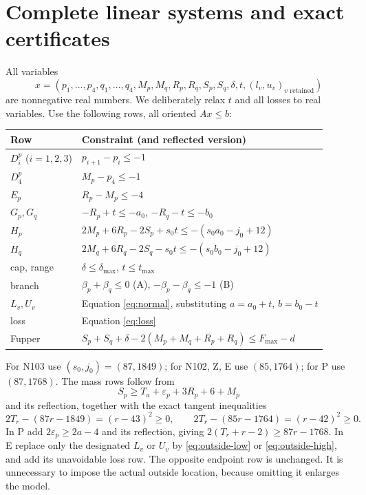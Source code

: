 \documentclass[11pt,a4paper]{article}
\begin{document}
\section{Complete linear systems and exact certificates}
All variables
\[
 x=(p_1,\ldots,p_4,q_1,\ldots,q_4,M_p,M_q,R_p,R_q,S_p,S_q,
       \delta,t,(l_v,u_v)_{v\text{ retained}})
\]
are nonnegative real numbers. We deliberately relax $t$ and all losses
to real variables. Use the following rows, all oriented $Ax\le b$:
\begin{center}\small
\begin{tabular}{ll}
\toprule
Row&Constraint (and reflected version)\\
\midrule
$D_i^p$ ($i=1,2,3$)&$p_{i+1}-p_i\le-1$\\
$D_4^p$&$M_p-p_4\le-1$\\
$E_p$&$R_p-M_p\le-4$\\
$G_p,G_q$&$-R_p+t\le-a_0$, $-R_q-t\le-b_0$\\
$H_p$&$2M_p+6R_p-2S_p+s_0t\le-(s_0a_0-j_0+12)$\\
$H_q$&$2M_q+6R_q-2S_q-s_0t\le-(s_0b_0-j_0+12)$\\
cap, range&$\delta\le\delta_{\max}$, $t\le t_{\max}$\\
branch&$\beta_p+\beta_q\le0$ (A), $-\beta_p-\beta_q\le-1$ (B)\\
$L_v,U_v$&Equation \eqref{eq:normal}, substituting $a=a_0+t$, $b=b_0-t$\\
loss&Equation \eqref{eq:loss}\\
Fupper&$S_p+S_q+\delta-2(M_p+M_q+R_p+R_q)\le F_{\max}-d$\\
\bottomrule
\end{tabular}
\end{center}
For N103 use $(s_0,j_0)=(87,1849)$; for N102, Z, E use $(85,1764)$;
for P use $(87,1768)$. The mass rows follow from
\[
 S_p\ge T_a+\varepsilon_p+3R_p+6+M_p
\]
and its reflection, together with the exact tangent inequalities
\[
 2T_r-(87r-1849)=(r-43)^2\ge0,\qquad
 2T_r-(85r-1764)=(r-42)^2\ge0.
\]
In P add $2\varepsilon_p\ge2a-4$ and its reflection, giving
$2(T_r+r-2)\ge87r-1768$.
In E replace only the designated $L_v$ or $U_v$ by
\eqref{eq:outside-low} or \eqref{eq:outside-high}, and add its unavoidable
loss row. The opposite endpoint row is unchanged. It is unnecessary to
impose the actual outside location, because omitting it enlarges the model.
\end{document}
